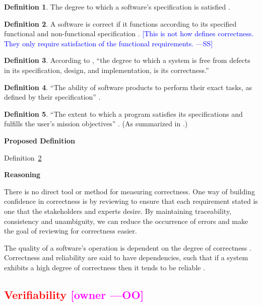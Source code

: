 \documentclass[letterpaper,cleveref]{lipics-v2019}
\newcommand{\authornote}[3]{\textcolor{#1}{[#3 ---#2]}}
\newcommand{\authornote}[3]{}
\newcommand{\wss}[1]{\authornote{blue}{SS}{#1}} %
\newcommand{\oo}[1]{\authornote{magenta}{OO}{#1}} %
\newcommand{\notdone}[1]{\textcolor{red}{#1}}
\theoremstyle{definition}
\newtheorem{defn}{Definition}
\begin{document}
\begin{defn}
  The degree to which a software's specification is satisfied
  \citep{berander2005software}.
\end{defn}

\begin{defn} \label{CorrectDefnSelected} 
  A software is correct if it functions according to its specified functional
  and non-functional specification \citep{GhezziEtAl2003}.  \wss{This is not how
    \citet{GhezziEtAl2003} defines correctness.  They only require satisfaction
    of the functional requirements.}

\end{defn}

\begin{defn}
  According to \citet{wilson2009quality}, ``the degree to which a system is free
  from defects in its specification, design, and implementation, is its
  correctness.''
\end{defn}

\begin{defn}
  ``The ability of software products to perform their exact tasks, as defined by
  their specification'' \citep{meyer1988object}.
\end{defn}

\begin{defn}
  ``The extent to which a program satisfies its specifications and fulfills the
  user's mission objectives'' \citep{McCallEtAl1977}. (As summarized in
  \citet{VanVliet2000}.)
\end{defn}

\noindent \textbf{Proposed Definition}

Definition~\ref{CorrectDefnSelected}
	
\noindent \textbf{Reasoning}

There is no direct tool or method for measuring correctness. One way of building
confidence in correctness is by reviewing to ensure that each requirement stated
is one that the stakeholders and experts desire.  By maintaining traceability,
consistency and unambiguity, we can reduce the occurrence of errors and make the
goal of reviewing for correctness easier.

The quality of a software's operation is dependent on the degree of correctness
\citep{berander2005software}. Correctness and reliability are said to have
dependencies, such that if a system exhibits a high degree of correctness then
it tends to be reliable \citep{GhezziEtAl2003}.

\subsection{\notdone{Verifiability} \oo{owner}}
\end{document}
